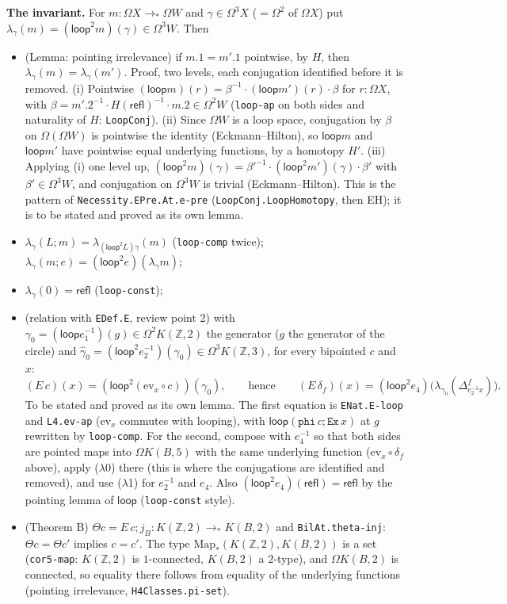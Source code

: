 \documentclass[11pt]{amsart}
\theoremstyle{definition}
\theoremstyle{remark}
\newcommand{\Om}{\Omega}
\newcommand{\code}[1]{\texttt{#1}}
\newcommand{\refl}{\mathsf{refl}}
\newcommand{\Map}{\mathrm{Map}_*}
\newcommand{\lp}{\mathsf{loop}}
\newcommand{\Z}{\mathbb{Z}}
\begin{document}
\noindent\textbf{The invariant.} For $m:\Om X\to_*\Om W$ and $\gamma\in\Om^3X$
($=\Om^2$ of $\Om X$) put $\lambda_\gamma(m)=(\lp^2m)(\gamma)\in\Om^3W$. Then
\begin{itemize}
\item[($\lambda$0)] (Lemma: pointing irrelevance) if $m.1=m'.1$ pointwise, by
$H$, then $\lambda_\gamma(m)=\lambda_\gamma(m')$. Proof, two levels, each
conjugation identified before it is removed. (i) Pointwise
$(\lp m)(r)=\beta^{-1}\cdot(\lp m')(r)\cdot\beta$ for $r:\Om X$, with
$\beta=m'.2^{-1}\cdot H(\refl)^{-1}\cdot m.2\in\Om^2W$ (\code{loop-ap} on both
sides and naturality of $H$: \code{LoopConj}). (ii) Since $\Om W$ is a loop
space, conjugation by $\beta$ on $\Om(\Om W)$ is pointwise the identity
(Eckmann--Hilton), so $\lp m$ and $\lp m'$ have pointwise equal underlying
functions, by a homotopy $H'$. (iii) Applying (i) one level up,
$(\lp^2m)(\gamma)=\beta'^{-1}\cdot(\lp^2m')(\gamma)\cdot\beta'$ with
$\beta'\in\Om^3W$, and conjugation on $\Om^3W$ is trivial (Eckmann--Hilton). This
is the pattern of \code{Necessity.EPre.At.e-pre} (\code{LoopConj.LoopHomotopy},
then EH); it is to be stated and proved as its own lemma.
\item[($\lambda$1)] $\lambda_\gamma(L;m)=\lambda_{(\lp^2L)\gamma}(m)$
(\code{loop-comp} twice); $\lambda_\gamma(m;e)=(\lp^2e)(\lambda_\gamma m)$;
\item[($\lambda$2)] $\lambda_\gamma(0)=\refl$ (\code{loop-const});
\item[($\lambda$3)] (relation with \code{EDef.E}, review point 2) with
$\gamma_0=(\lp e_1^{-1})(g)\in\Om^2K(\Z,2)$ the generator ($g$ the generator of
the circle) and $\hat\gamma_0=(\lp^2e_2^{-1})(\gamma_0)\in\Om^3K(\Z,3)$, for every
bipointed $c$ and $x$:
\[
  (E\,c)(x)=(\lp^2(\mathrm{ev}_x\circ c))(\gamma_0),\qquad\text{hence}\qquad
  (E\,\delta_f)(x)=(\lp^2e_4)\big(\lambda_{\hat\gamma_0}(\Delta^f_{e_2^{-1}x})\big).
\]
To be stated and proved as its own lemma. The first equation is
\code{ENat.E-loop} and \code{L4.ev-ap} ($\mathrm{ev}_x$ commutes with looping),
with $\lp(\code{phi}\,c;\code{Ex}\,x)$ at $g$ rewritten by \code{loop-comp}. For
the second, compose with $e_4^{-1}$ so that both sides are pointed maps into
$\Om K(B,5)$ with the same underlying function ($\mathrm{ev}_x\circ\delta_f$
above), apply ($\lambda$0) there (this is where the conjugations are identified
and removed), and use ($\lambda$1) for $e_2^{-1}$ and $e_4$. Also
$(\lp^2e_4)(\refl)=\refl$ by the pointing lemma of $\lp$ (\code{loop-const}
style).
\item[($\lambda$4)] (Theorem B) $\Theta c=E\,c;j_B:K(\Z,2)\to_*K(B,2)$ and
\code{BilAt.theta-inj}: $\Theta c=\Theta c'$ implies $c=c'$. The type
$\Map(K(\Z,2),K(B,2))$ is a set (\code{cor5-map}: $K(\Z,2)$ is $1$-connected,
$K(B,2)$ a $2$-type), and $\Om K(B,2)$ is connected, so equality there follows
from equality of the underlying functions (pointing irrelevance,
\code{H4Classes.pi-set}).
\end{itemize}
\end{document}
